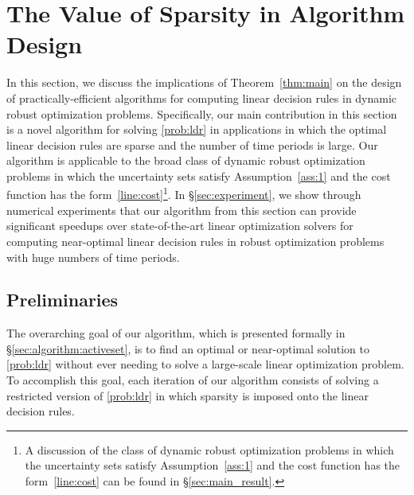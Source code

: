 \documentclass[nonblindrev,mnsc]{informs3} %
\begin{document}
\section{The Value of Sparsity in Algorithm Design} \label{sec:algorithm}
In this section, we discuss the implications of Theorem~\ref{thm:main} on the design of practically-efficient algorithms for computing linear decision rules in dynamic robust optimization problems. Specifically, our main contribution in this section is a novel algorithm for solving \eqref{prob:ldr} in applications in which the optimal linear decision rules are sparse and the number of time periods is large.  Our  algorithm is applicable to the broad class of dynamic robust optimization    problems in which the  uncertainty sets satisfy Assumption~\ref{ass:1} and the cost function has the form~\eqref{line:cost}\footnote{A discussion of the class of dynamic robust optimization problems in which the  uncertainty sets satisfy Assumption~\ref{ass:1} and the cost function has the form~\eqref{line:cost} can be found in \S\ref{sec:main_result}.}. In \S\ref{sec:experiment},  we show through numerical experiments  that our  algorithm from this section can provide {significant} speedups over state-of-the-art linear optimization solvers for computing near-optimal linear decision rules in robust optimization problems with huge numbers of time periods. 
\subsection{Preliminaries} \label{sec:algorithm:prelim}

The overarching goal of our algorithm, which is presented formally in \S\ref{sec:algorithm:activeset},  is to find an optimal or near-optimal solution to \eqref{prob:ldr} without ever needing to solve a large-scale linear optimization problem. To accomplish this goal, each iteration of our  algorithm consists of solving a restricted version of \eqref{prob:ldr} in which  sparsity is imposed onto the linear decision rules.
\end{document}
